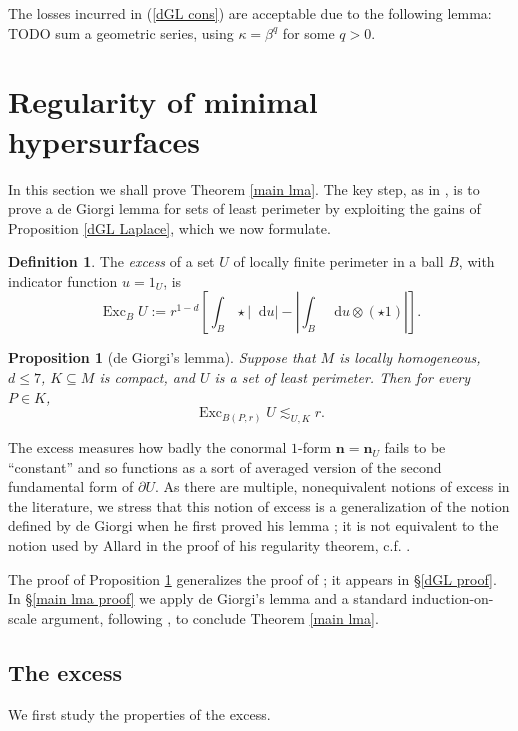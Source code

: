 \documentclass[reqno,12pt,letterpaper]{amsart}
\DeclareMathOperator{\Exc}{Exc}
\newcommand*\dif{\mathop{}\!\mathrm{d}}
\newcommand{\normal}{\mathbf n}
\newcommand{\dfn}[1]{\emph{#1}\index{#1}}
\newtheorem{proposition}[theorem]{Proposition}
\theoremstyle{definition}
\newtheorem{definition}[theorem]{Definition}
\numberwithin{equation}{section}
\begin{document}
The losses incurred in (\ref{dGL cons}) are acceptable due to the following lemma: TODO sum a geometric series, using $\kappa = \beta^q$ for some $q > 0$.





\section{Regularity of minimal hypersurfaces}\label{de Giorgi section}
In this section we shall prove Theorem \ref{main lma}.
The key step, as in \cite{Miranda66}, is to prove a de Giorgi lemma for sets of least perimeter by exploiting the gains of Proposition \ref{dGL Laplace}, which we now formulate.

\begin{definition}
The \dfn{excess} of a set $U$ of locally finite perimeter in a ball $B$, with indicator function $u = 1_U$, is
$$\Exc_B U := r^{1 - d}\left[\int_B \star |\dif u| - \left|\int_B \dif u \otimes (\star 1)\right|\right].$$
\end{definition}

\begin{proposition}[de Giorgi's lemma]\label{dGL final}
Suppose that $M$ is locally homogeneous, $d \leq 7$, $K \subseteq M$ is compact, and $U$ is a set of least perimeter. Then for every $P \in K$,
$$\Exc_{B(P, r)} U \lesssim_{U, K} r.$$
\end{proposition}

The excess measures how badly the conormal $1$-form $\normal = \normal_U$ fails to be ``constant'' and so functions as a sort of averaged version of the second fundamental form of $\partial U$.
As there are multiple, nonequivalent notions of excess in the literature, we stress that this notion of excess is a generalization of the notion defined by de Giorgi when he first proved his lemma \cite{deGiorgi61}; it is not equivalent to the notion used by Allard \cite{Allard72} in the proof of his regularity theorem, c.f. \cite{colding2011course}.

The proof of Proposition \ref{dGL final} generalizes the proof of \cite[Teorema 5.7]{Miranda66}; it appears in \S\ref{dGL proof}.
In \S\ref{main lma proof} we apply de Giorgi's lemma and a standard induction-on-scale argument, following \cite[Teorema 6.5]{Miranda66}, to conclude Theorem \ref{main lma}.

\subsection{The excess}
We first study the properties of the excess.
\end{document}
